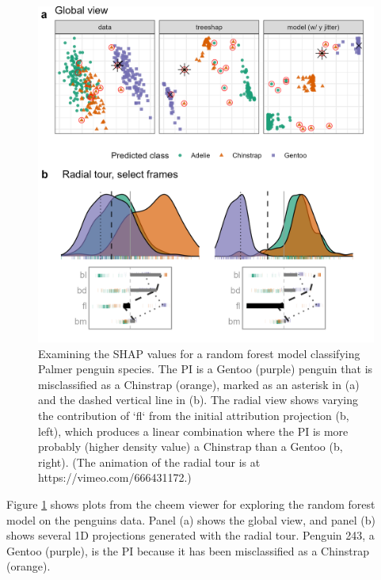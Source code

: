 \documentclass[
]{article}
\begin{document}
\begin{figure}

{\centering \includegraphics[width=1\linewidth]{./figures/case_penguins} 

}

\caption{Examining the SHAP values for a random forest model classifying Palmer penguin species. The PI is a Gentoo (purple) penguin that is misclassified as a Chinstrap (orange), marked as an asterisk in (a) and the dashed vertical line in (b). The radial view shows varying the contribution of `fl` from the initial attribution projection (b, left), which produces a linear combination where the PI is more probably (higher density value) a Chinstrap than a Gentoo (b, right). (The animation of the radial tour is at https://vimeo.com/666431172.)}\label{fig:casepenguins}
\end{figure}

Figure \ref{fig:casepenguins} shows plots from the cheem viewer for exploring the random forest model on the penguins data. Panel (a) shows the global view, and panel (b) shows several 1D projections generated with the radial tour. Penguin 243, a Gentoo (purple), is the PI because it has been misclassified as a Chinstrap (orange).
\end{document}
